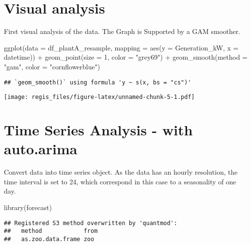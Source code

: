 \documentclass[
]{article}
\newenvironment{Shaded}{\begin{snugshade}}{\end{snugshade}}
\newcommand{\AttributeTok}[1]{\textcolor[rgb]{0.77,0.63,0.00}{#1}}
\newcommand{\DecValTok}[1]{\textcolor[rgb]{0.00,0.00,0.81}{#1}}
\newcommand{\FunctionTok}[1]{\textcolor[rgb]{0.00,0.00,0.00}{#1}}
\newcommand{\NormalTok}[1]{#1}
\newcommand{\SpecialCharTok}[1]{\textcolor[rgb]{0.00,0.00,0.00}{#1}}
\newcommand{\StringTok}[1]{\textcolor[rgb]{0.31,0.60,0.02}{#1}}
\begin{document}
\hypertarget{visual-analysis}{%
\section{Visual analysis}\label{visual-analysis}}

First visual analysis of the data. The Graph is Supported by a GAM
smoother.

\begin{Shaded}
\begin{Highlighting}[]
\FunctionTok{ggplot}\NormalTok{(}\AttributeTok{data =}\NormalTok{ df\_plantA\_resample,}
  \AttributeTok{mapping =} \FunctionTok{aes}\NormalTok{(}\AttributeTok{y =}\NormalTok{ Generation\_kW, }\AttributeTok{x =}\NormalTok{ datetime)) }\SpecialCharTok{+}
  \FunctionTok{geom\_point}\NormalTok{(}\AttributeTok{size =} \DecValTok{1}\NormalTok{, }\AttributeTok{color =} \StringTok{"grey69"}\NormalTok{) }\SpecialCharTok{+}
  \FunctionTok{geom\_smooth}\NormalTok{(}\AttributeTok{method =} \StringTok{"gam"}\NormalTok{, }\AttributeTok{color =} \StringTok{"cornflowerblue"}\NormalTok{)}
\end{Highlighting}
\end{Shaded}

\begin{verbatim}
## `geom_smooth()` using formula 'y ~ s(x, bs = "cs")'
\end{verbatim}

\texttt{[image: regis\_files/figure-latex/unnamed-chunk-5-1.pdf]}

\hypertarget{time-series-analysis---with-auto.arima}{%
\section{Time Series Analysis - with
auto.arima}\label{time-series-analysis---with-auto.arima}}

Convert data into time series object. As the data has an hourly
resolution, the time interval is set to 24, which correspond in this
case to a seasonality of one day.

\begin{Shaded}
\begin{Highlighting}[]
\FunctionTok{library}\NormalTok{(forecast)}
\end{Highlighting}
\end{Shaded}

\begin{verbatim}
## Registered S3 method overwritten by 'quantmod':
##   method            from
##   as.zoo.data.frame zoo
\end{verbatim}
\end{document}
